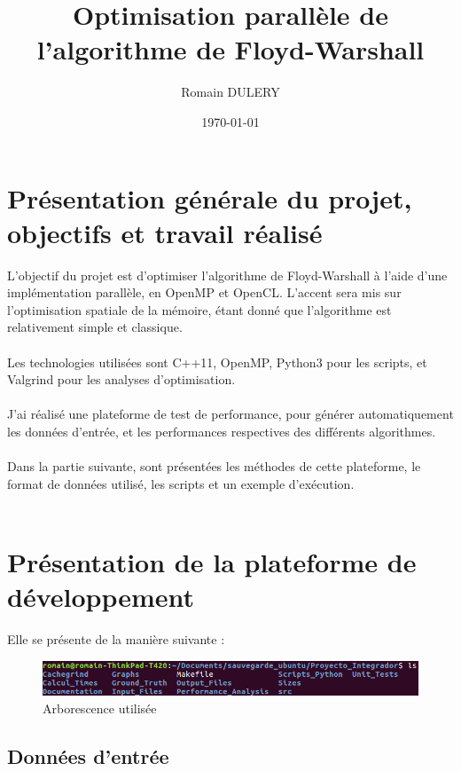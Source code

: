 \documentclass[a4paper,11pt]{article}
\title{Optimisation parallèle de l'algorithme de Floyd-Warshall}
\author{Romain DULERY}
\date{\today}
\begin{document}
\maketitle

\tableofcontents
\newpage

\section{Présentation générale du projet, objectifs et travail réalisé}

L'objectif du projet est d'optimiser l'algorithme de Floyd-Warshall à l'aide d'une implémentation parallèle, en OpenMP et OpenCL. L'accent sera mis sur l'optimisation spatiale de la mémoire, étant donné que l'algorithme est relativement simple et classique.\\\\
Les technologies utilisées sont C++11, OpenMP, Python3 pour les scripts, et Valgrind pour les analyses d'optimisation.\\\\
J'ai réalisé une plateforme de test de performance, pour générer automatiquement les données d'entrée, et les performances respectives des différents algorithmes.\\\\
Dans la partie suivante, sont présentées les méthodes de cette plateforme, le format de données utilisé, les scripts et un exemple d'exécution.\\\\

\section{Présentation de la plateforme de développement}

Elle se présente de la manière suivante :

\begin{figure}[H]
\begin{center}
  \includegraphics[scale=0.6]{arborescence.png}
  \caption{Arborescence utilisée}
\end{center}
\end{figure}

\subsection{Données d'entrée}
\end{document}
